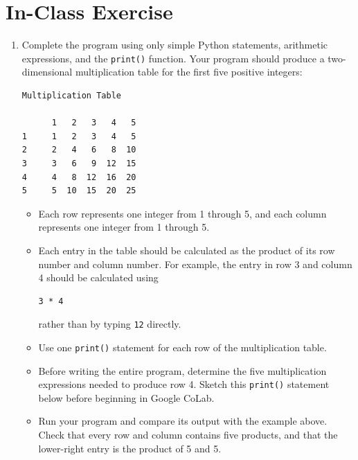 \documentclass{article}
\begin{document}
\section{In-Class Exercise}

\begin{enumerate}

\item Complete the program using only simple Python statements, arithmetic expressions, and the \texttt{print()} function.  Your program should produce a two-dimensional multiplication table for the first five positive integers:

\begin{verbatim}
Multiplication Table

      1   2   3   4   5
1     1   2   3   4   5
2     2   4   6   8  10
3     3   6   9  12  15
4     4   8  12  16  20
5     5  10  15  20  25
\end{verbatim}

\begin{itemize}

\item Each row represents one integer from 1 through 5, and each column represents one integer from 1 through 5. \\ \vspace{0.25cm}

\item Each entry in the table should be calculated as the product of its row number and column number.  For example, the entry in row 3 and column 4 should be calculated using
\begin{verbatim}
3 * 4
\end{verbatim}
rather than by typing \texttt{12} directly. \\ \vspace{0.25cm}

\item Use one \texttt{print()} statement for each row of the multiplication table. \\ \vspace{0.25cm}

\item Before writing the entire program, determine the five multiplication expressions needed to produce row 4. Sketch this \texttt{print()} statement below before beginning in Google CoLab. \\ \vspace{0.75cm}

\item Run your program and compare its output with the example above.  Check that every row and column contains five products, and that the lower-right entry is the product of 5 and 5. \\ \vspace{0.5cm}

\end{itemize}
\end{enumerate}
\end{document}
